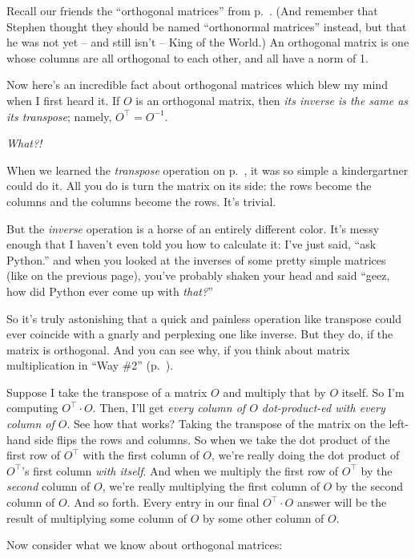 Recall our friends the ``orthogonal matrices'' from
p.~\pageref{orthogonalMatrices}. (And remember that Stephen thought they should
be named ``orthonormal matrices'' instead, but that he was not yet -- and still
isn't -- King of the World.) An orthogonal matrix is one whose columns are all
orthogonal to each other, and all have a norm of 1.

Now here's an incredible fact about orthogonal matrices which blew my mind when
I first heard it. If $O$ is an orthogonal matrix, then \textit{its inverse is
the same as its transpose}; namely, $O^\intercal = O^{-1}$.

\textit{What?!}

When we learned the \textit{transpose} operation on p.~\pageref{transpose}, it
was so simple a kindergartner could do it. All you do is turn the matrix on its
side: the rows become the columns and the columns become the rows. It's
trivial.

But the \textit{inverse} operation is a horse of an entirely different color.
It's messy enough that I haven't even told you how to calculate it: I've just
said, ``ask Python.'' and when you looked at the inverses of some pretty simple
matrices (like on the previous page), you've probably shaken your head and said
``geez, how did Python ever come up with \textit{that?}''

So it's truly astonishing that a quick and painless operation like transpose
could ever coincide with a gnarly and perplexing one like inverse. But they do,
if the matrix is orthogonal. And you can see why, if you think about matrix
multiplication in ``Way \#2'' (p.~\pageref{matMultWay2}).

Suppose I take the transpose of a matrix $O$ and multiply that by $O$ itself.
So I'm computing $O^\intercal \cdot O$. Then, I'll get \textit{every column of
$O$ dot-product-ed with every column of $O$}. See how that works? Taking the
transpose of the matrix on the left-hand side flips the rows and columns. So
when we take the dot product of the first row of $O^\intercal$ with the first
column of $O$, we're really doing the dot product of $O^\intercal$'s first
column \textit{with itself}. And when we multiply the first row of
$O^\intercal$ by the \textit{second} column of $O$, we're really multiplying
the first column of $O$ by the second column of $O$. And so forth. Every entry
in our final $O^\intercal \cdot O$ answer will be the result of multiplying
some column of $O$ by some other column of $O$.

Now consider what we know about orthogonal matrices:

